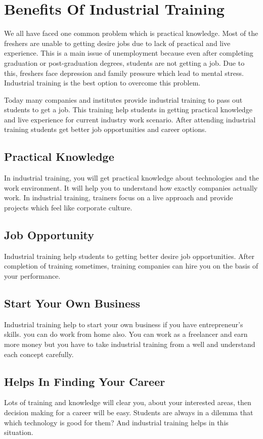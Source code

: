 \documentclass[12pt]{article}
\begin{document}
\section{Benefits Of Industrial Training}
We all have faced one common problem which is practical knowledge. Most of the freshers are unable to getting desire jobs due to lack of practical and live experience. This is a main issue of unemployment because even after completing graduation or post-graduation degrees, students are not getting a job. Due to this, freshers face depression and family pressure which lead to mental stress. Industrial training is the best option to overcome this problem.

Today many companies and institutes provide industrial training to pass out students to get a job. This training help students in getting practical knowledge and live experience for current industry work scenario. After attending industrial training students get better job opportunities and career options.

\subsection{Practical Knowledge} In industrial training, you will get practical knowledge about technologies and the work environment. It will help you to understand how exactly companies actually work. In industrial training, trainers focus on a live approach and provide projects which feel like corporate culture.

\subsection{Job Opportunity}
Industrial training help students to getting better desire job opportunities. After completion of training sometimes, training companies can hire you on the basis of your performance.

\subsection{Start Your Own Business}
Industrial training help to start your own business if you have entrepreneur’s skills. you can do work from home also. You can work as a freelancer and earn more money but you have to take industrial training from a well and understand each concept carefully.

\subsection{Helps In Finding Your Career}
Lots of training and knowledge will clear you, about your interested areas, then decision making for a career will be easy. Students are always in a dilemma that which technology is good for them? And industrial training helps in this situation.
\end{document}
